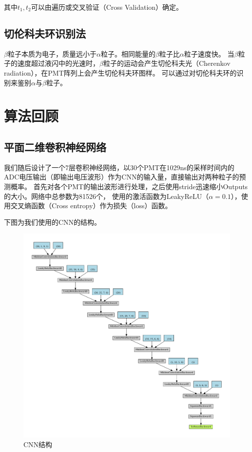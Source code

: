 \documentclass{ctexart}
\begin{document}
其中$t_{1},t_{2}$可以由遍历或交叉验证（Cross Validation）确定。

\subsection{切伦科夫环识别法}
$\beta$粒子本质为电子，质量远小于$\alpha$粒子。相同能量的$\beta$粒子比$\alpha$粒子速度快。
当$\beta$粒子的速度超过液闪中的光速时，$\beta$粒子的运动会产生切伦科夫光（Cherenkov radiation），在PMT阵列上会产生切伦科夫环图样。
可以通过对切伦科夫环的识别来鉴别$\alpha$与$\beta$粒子。

\section{算法回顾}
\subsection{平面二维卷积神经网络} %
\label{sub:平面二维卷积神经网络}
我们随后设计了一个7层卷积神经网络，以30个PMT在1029ns的采样时间内的ADC电压输出（即输出电压波形）作为CNN的输入量，直接输出对两种粒子的预测概率。
首先对各个PMT的输出波形进行处理，之后使用stride迅速缩小Outputs的大小。网络中总参数为81526个，
使用的激活函数为LeakyReLU（$\alpha=0.1$），使用交叉熵函数（Cross entropy）作为损失（loss）函数。


下图为我们使用的CNN的结构。

\begin{figure}[H]
    \centering
    \includegraphics[width=1.0\linewidth]{net.pdf}
    \caption{CNN结构}
\end{figure}
\end{document}

